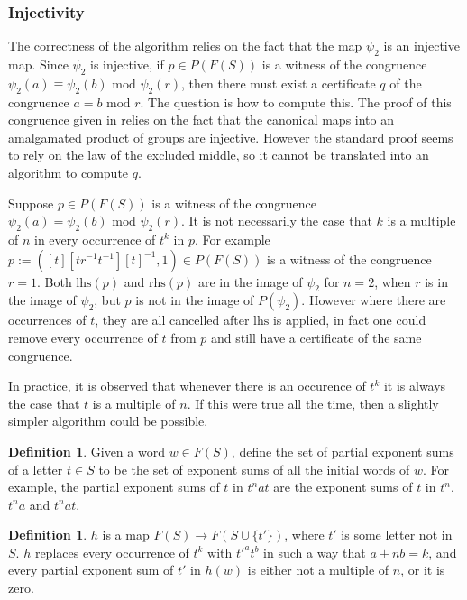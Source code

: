 \documentclass[12pt]{article} %
\theoremstyle{definition}
\theoremstyle{definition}
\theoremstyle{definition}
\theoremstyle{definition}
\theoremstyle{definition}
\newtheorem{defn}[theorem]{Definition}
\theoremstyle{definition}
\begin{document}
\subsubsection{Injectivity}\label{powproofs}

The correctness of the algorithm relies on the fact that the map $\psi_2$ is an injective map.
Since $\psi_2$ is injective, if $p \in P(F(S))$ is a witness of the congruence
$\psi_2(a) \equiv \psi_2(b) \text{ mod } \psi_2(r)$, then there must exist a certificate
$q$ of the congruence $a = b \text{ mod }r$. The question is how to compute this. The proof
of this congruence given in \cite{PutmanOneRelator} relies on the fact that the canonical maps into an amalgamated product
of groups are injective. However the standard proof
seems to rely on the law of the excluded middle, so
it cannot be translated into an algorithm to compute $q$.

Suppose $p \in P(F(S))$ is a witness of the congruence
$\psi_2(a) = \psi_2(b) \text{ mod } \psi_2(r)$. It is not necessarily the case that $k$
is a multiple of $n$ in every occurrence of $t^k$ in $p$. For example
$p := ([t][tr^{-1}t^{-1}][t]^{-1}, 1) \in P(F(S))$ is a witness of the congruence
$r = 1$. Both $\text{lhs}(p)$ and $\text{rhs}(p)$ are in the image of
$\psi_2$ for $n = 2$, when $r$ is in the image of $\psi_2$,
but $p$ is not in the image of $P(\psi_2)$. However where there are
occurrences of $t$, they are all cancelled after $\text{lhs}$ is applied, in fact
one could remove every occurrence of $t$ from $p$ and still have a certificate of the same
congruence.

In practice, it is observed that whenever there is an occurence of $t^k$ it is always
the case that $t$ is a multiple of $n$. If this were true all the time, then a slightly
simpler algorithm could be possible.

\begin{defn}
  Given a word $w \in F(S)$, define the set of partial exponent sums of a letter $t \in S$ to
  be the set of exponent sums of all the initial words of $w$. For example, the partial
  exponent sums of $t$ in $t^n a t$ are the exponent sums of $t$ in
  $t^n$, $t^na$ and $t^nat$.
\end{defn}

\begin{defn}
  $h$ is a map $F(S) \to F(S \cup \{t'\})$, where $t'$ is some letter not in $S$.
  $h$ replaces every occurrence of $t^k$ with $t'^at^b$ in such a way that $a + n b = k$,
  and every partial exponent sum of $t'$ in $h(w)$ is either not a multiple of $n$,
  or it is zero.
\end{defn}
\end{document}
